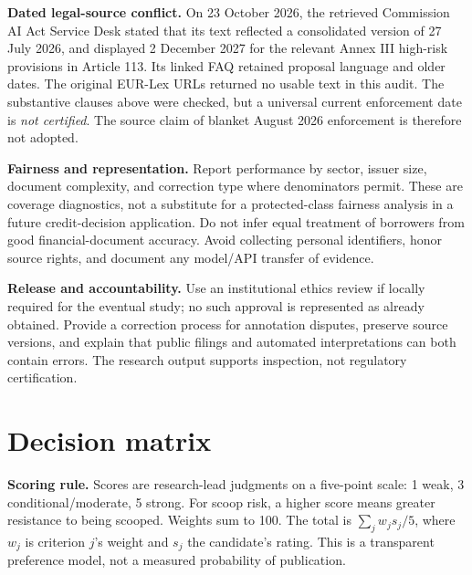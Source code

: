 \documentclass[11pt,a4paper]{article}
\newcommand{\pbreak}{\clearpage}
\newcommand{\lead}[1]{\textbf{\color{navy}#1}}
\begin{document}
\begin{decisionbox}
\lead{Dated legal-source conflict.} On 23 October 2026, the retrieved Commission AI Act Service Desk stated that its text reflected a consolidated version of 27 July 2026, and displayed 2 December 2027 for the relevant Annex III high-risk provisions in Article 113. Its linked FAQ retained proposal language and older dates. The original EUR-Lex URLs returned no usable text in this audit. The substantive clauses above were checked, but a universal current enforcement date is \emph{not certified}. The source claim of blanket August 2026 enforcement is therefore not adopted.
\end{decisionbox}

\lead{Fairness and representation.} Report performance by sector, issuer size, document complexity, and correction type where denominators permit. These are coverage diagnostics, not a substitute for a protected-class fairness analysis in a future credit-decision application. Do not infer equal treatment of borrowers from good financial-document accuracy. Avoid collecting personal identifiers, honor source rights, and document any model/API transfer of evidence.

\lead{Release and accountability.} Use an institutional ethics review if locally required for the eventual study; no such approval is represented as already obtained. Provide a correction process for annotation disputes, preserve source versions, and explain that public filings and automated interpretations can both contain errors. The research output supports inspection, not regulatory certification.

\pbreak


\pbreak
\appendix
\section{Decision matrix}
\lead{Scoring rule.} Scores are research-lead judgments on a five-point scale: 1 weak, 3 conditional/moderate, 5 strong. For scoop risk, a higher score means greater resistance to being scooped. Weights sum to 100. The total is $\sum_j w_j s_j/5$, where $w_j$ is criterion $j$'s weight and $s_j$ the candidate's rating. This is a transparent preference model, not a measured probability of publication.
\end{document}
